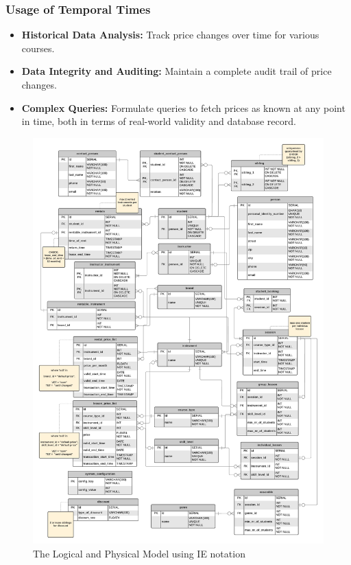 \documentclass[a4paper]{scrartcl}
\begin{document}
\subsubsection*{Usage of Temporal Times}
\begin{itemize}
  \item \textbf{Historical Data Analysis:} Track price changes over time for various courses.
  \item \textbf{Data Integrity and Auditing:} Maintain a complete audit trail of price changes.
  \item \textbf{Complex Queries:} Formulate queries to fetch prices as known at any point in time, both in terms of real-world validity and database record.
\end{itemize}

\begin{figure}[h!]
  \begin{center}
    \includegraphics[width=\textwidth]{../figures/logi_phys.png}
    \caption{The Logical and Physical Model using IE notation}
    \label{fig:lpm}
  \end{center}
\end{figure}
\end{document}
